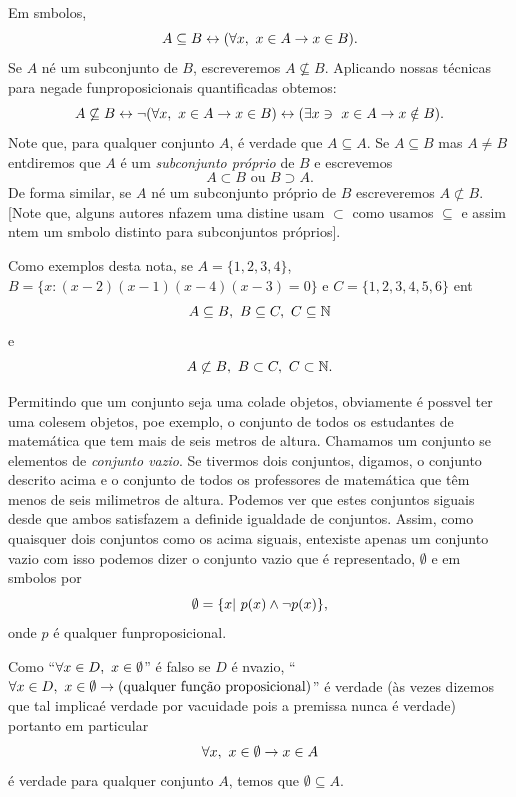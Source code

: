 Em s\ih mbolos,
\[
A \subseteq B \leftrightarrow (\forall x,\textrm{ } x\in A \to x\in B).
\]
Se $A$ n\ao \'e um subconjunto de $B$, escreveremos $A\not\subseteq B$. Aplicando nossas t\'ecnicas para nega\cao de fun\coes proposicionais quantificadas obtemos:
\[
A\not\subseteq B \leftrightarrow \lnot(\forall x,\textrm{ } x\in A \to x\in B) \leftrightarrow (\exists x \ni \textrm{ } x\in A \to x\notin B).
\]
Note que, para qualquer conjunto $A$, \'e verdade que $A \subseteq A$. Se $A \subseteq B$ mas $A\neq B$ ent\ao diremos que $A$ \'e um {\it subconjunto pr\'oprio} de $B$ e escrevemos
\[
A\subset B \textrm{ ou } B\supset A.
\] 
De forma similar, se $A$ n\ao \'e um subconjunto pr\'oprio de $B$ escreveremos $A\not\subset B$. [Note que, alguns autores n\ao fazem uma distin\cao e usam $\subset$ como usamos $\subseteq$ e assim n\ao tem um s\ih mbolo distinto para subconjuntos pr\'oprios].

Como exemplos desta nota\caoi, se $A=\{1,2,3,4\}$, $B= \{x: (x-2)(x-1)(x-4)(x-3)=0\}$ e $C=\{1,2,3,4,5,6\}$ ent\ao
\[
A\subseteq B, \textrm{ } B\subseteq C, \textrm{ } C\subseteq \mathbb{N}
\]
e
\[
A\not\subset B, \textrm{ } B\subset C, \textrm{ } C\subset \mathbb{N}.
\]

Permitindo que um conjunto seja uma cola\cao de objetos, obviamente \'e poss\ih vel ter uma cole\cao sem objetos, poe exemplo, o conjunto de todos os estudantes de matem\'atica que tem mais de seis metros de altura. Chamamos um conjunto se elementos de {\it conjunto vazio}. Se tivermos dois conjuntos, digamos, o conjunto descrito acima e o conjunto de todos os professores de matem\'atica que t\^em menos de seis milimetros de altura. Podemos ver que estes conjuntos s\ao iguais desde que ambos satisfazem a defini\cao de igualdade de conjuntos. Assim, como quaisquer dois conjuntos como os acima s\ao iguais, ent\ao existe apenas um conjunto vazio com isso podemos dizer o conjunto vazio que \'e representado, $\emptyset$ e em s\ih mbolos por
\[
\emptyset = \{x| \textrm{ } p(x)\wedge \lnot p(x)\},
\]  
onde $p$ \'e qualquer fun\cao proposicional.

Como ``$\forall x\in D,\textrm{ } x\in\emptyset$'' \'e falso se $D$ \'e n\ao vazio, ``$\forall x\in D,\espaco x\in\emptyset\to \textrm{(qualquer fun\cao proposicional)}$'' \'e verdade (\`as vezes dizemos que tal implica\cao \'e verdade por vacuidade pois a premissa nunca \'e verdade) portanto em particular
\[
\forall x, \textrm{ } x\in\emptyset\to x\in A
\] 
\'e verdade para qualquer conjunto $A$, temos que $\emptyset\subseteq A.$

